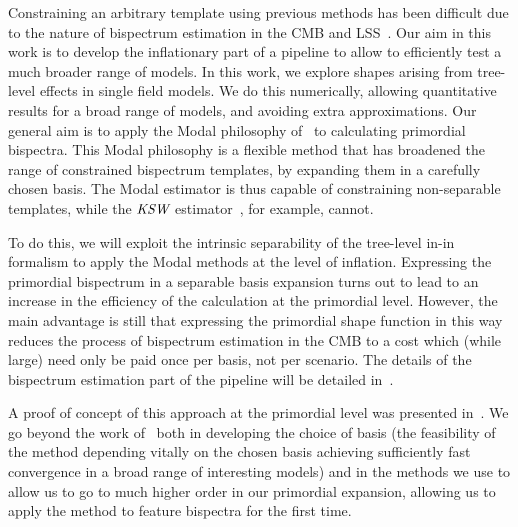 Constraining an arbitrary template using previous methods has been difficult
due to the nature of bispectrum estimation in the CMB and
LSS~\cite{lss_baldauf,lss_karagiannis,chen_future_lss,Scoccimarro_2012}.
Our aim in this work is to develop the inflationary part
of a pipeline to allow to efficiently test a much broader range of models.
In this work, we explore shapes arising from tree-level effects in single field models.
We do this numerically, allowing quantitative results for a broad
range of models, and avoiding extra approximations.
Our general aim is to apply the Modal philosophy of~\cite{FergShell_1,FergShell_2,FergShell_3}
to calculating primordial bispectra.
This Modal philosophy is a flexible method that has broadened the range of constrained
bispectrum templates, by expanding them in a carefully chosen basis.
The Modal estimator is thus capable of constraining
non-separable templates, while the ${\textit{\text{KSW}}}$ estimator~\cite{Komatsu_2005}, for example, cannot.


To do this, we will exploit the intrinsic separability of the
tree-level in-in formalism to apply the Modal methods at the level of inflation.
Expressing the primordial bispectrum in a separable
basis expansion turns out to lead to an increase in the efficiency
of the calculation at the primordial level.
However, the main advantage is still that
expressing the primordial shape function
in this way reduces the process of bispectrum estimation in the CMB to a
cost which (while large) need only be paid once per basis,
not per scenario.
The details of the bispectrum estimation part of
the pipeline will be detailed in~\cite{Sohn_2021}.


A proof of concept of this approach at the primordial level was presented in~\cite{Funakoshi}.
We go beyond the work of~\cite{Funakoshi} both in developing the choice of basis
(the feasibility of the method depending vitally on the chosen basis
achieving sufficiently fast convergence in a broad range of interesting models)
and in the methods we use to allow us to go to much higher order in our primordial expansion,
allowing us to apply the method to feature bispectra for the first time.


